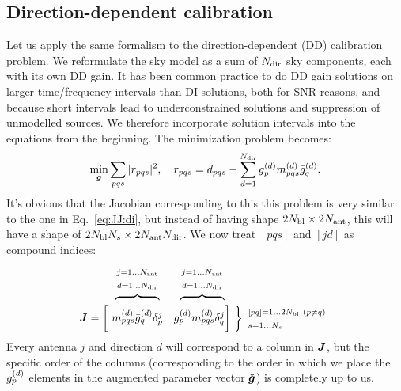 \documentclass[useAMS,usenatbib]{mn2e}
\makeatletter
\newcommand{\mat}[1]{{\bmath{#1}}}
\newcommand{\JJ}{\mat{J}} %
\newcommand{\Stack}[1]{\begin{array}{@{}c@{}}#1\end{array}}
\newcommand{\AUG}[1]{\bmath{\breve{#1}}}
\newcommand{\Gg}{\AUG{g}}
\numberwithin{equation}{section}
\providecommand{\DIFdel}[1]{{\protect\color{red}\sout{#1}}}                      %
\providecommand{\DIFdelbegin}{} %
\providecommand{\DIFdelend}{} %
\makeatother
\begin{document}
\subsection{Direction-dependent calibration}
\label{sec:unpol:DD}

Let us apply the same formalism to the direction-dependent (DD) calibration problem. 
We reformulate the sky model as a sum of $N_\mathrm{dir}$ sky components, each with its own DD 
gain. It has been common practice to do DD gain solutions on larger time/frequency intervals than DI 
solutions, both for SNR reasons, and because short intervals lead to underconstrained solutions
and suppression of unmodelled sources. We therefore incorporate solution intervals into the
equations from the beginning. The minimization problem becomes:
\begin{equation}
\label{eq:cal:dd:unpol}
\min_{\bmath{g}}\sum_{pqs}|r_{pqs}|^2, ~~~
r_{pqs} = d_{pqs} - \sum_{d=1}^{\Nd} \ggd_p \mmd_{pqs} \ggdH_q.
\end{equation}
It's obvious that the Jacobian corresponding to this \DIFdelbegin \DIFdel{this }\DIFdelend problem is very similar to the one 
in Eq.~\ref{eq:JJ:di}, but instead of having shape $2N_\mathrm{bl}\times2N_\mathrm{ant}$, this will have a 
shape of $2N_\mathrm{bl}N_s\times 2N_\mathrm{ant}N_\mathrm{dir}$. We now treat $[pqs]$ and $[jd]$ as compound indices: 
\begin{equation}
\begin{array}{r@{~}cc@{~}cc}
 & \overbrace{~~~~~~~~~~~~}^{\Stack{\scriptstyle j=1\dots \Na\\\scriptstyle d=1\dots \Nd}} & 
   \overbrace{~~~~~~~~~~~~}^{\Stack{\scriptstyle j=1\dots \Na\\\scriptstyle d=1\dots \Nd}} \\
\JJ = \bigg [ &
  \mmd_{pqs}\ggdH_q \delta^j_p & 
  \ggd_p \mmd_{pqs}  \delta^j_q 
\bigg ] &
\bm{\bigg \}}
\begin{array}{l}
\scriptstyle [pq]=1\dots 2\Nbl~(p\ne q)\\ \scriptstyle s=1\dots\Ns
\end{array}
\end{array}
\end{equation}
Every antenna $j$ and direction $d$ will correspond to a column in $\JJ$, but the specific order of the columns 
(corresponding to the order in which we place the $g^{(d)}_p$ elements in the augmented parameter vector $\Gg$)
is completely up to us. 
\end{document}

